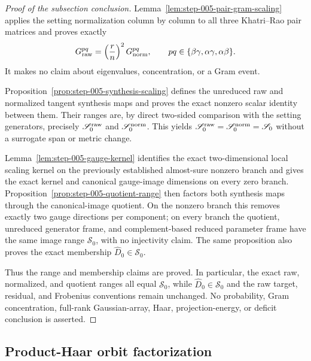 \begin{proof}[Proof of the subsection conclusion]

Lemma~\ref{lem:step-005-pair-gram-scaling} applies the setting normalization
column by column to all three Khatri--Rao pair matrices and proves exactly
\[
  G_{\rm raw}^{pq}=\left(\frac rn\right)^2G_{\rm norm}^{pq},
  \qquad pq\in\{\beta\gamma,\alpha\gamma,\alpha\beta\}.
\]
It makes no claim about eigenvalues, concentration, or a Gram event.

Proposition~\ref{prop:step-005-synthesis-scaling} defines the unreduced raw
and normalized tangent synthesis maps and proves the exact nonzero scalar
identity between them. Their ranges are, by direct two-sided comparison with
the setting generators, precisely \(\mathscr S_0^{\rm raw}\) and
\(\mathscr S_0^{\rm norm}\). This yields
\(\mathscr S_0^{\rm raw}=\mathscr S_0^{\rm norm}=\mathscr S_0\) without a
surrogate span or metric change.

Lemma~\ref{lem:step-005-gauge-kernel} identifies the exact two-dimensional
local scaling kernel on the previously established almost-sure nonzero branch and
gives the exact kernel and canonical gauge-image dimensions on every zero
branch.
Proposition~\ref{prop:step-005-quotient-range} then factors both synthesis
maps through the canonical-image quotient. On the nonzero branch this removes
exactly two gauge directions per component; on every branch the quotient,
unreduced generator frame, and complement-based reduced parameter frame have
the same image range \(\mathscr S_0\), with no injectivity claim. The same
proposition also proves the exact membership
\(\widehat D_0\in\mathscr S_0\).

Thus the range and membership claims are proved. In particular, the exact raw,
normalized, and quotient ranges all equal \(\mathscr S_0\), while
\(\widehat D_0\in\mathscr S_0\) and the raw target, residual, and Frobenius
conventions remain unchanged. No probability, Gram concentration,
full-rank Gaussian-array, Haar, projection-energy, or deficit conclusion is
asserted.

\end{proof}

\subsection{Product-Haar orbit factorization}\label{app:step-006}

